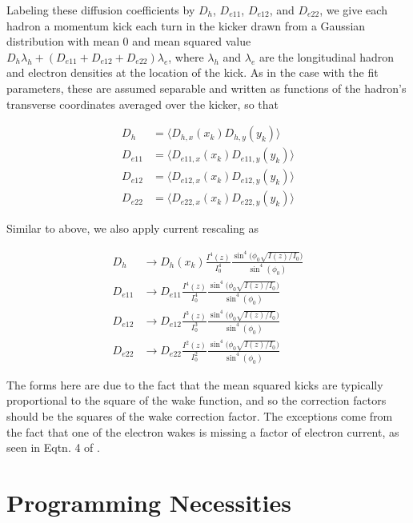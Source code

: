 \documentclass[letterpaper,11pt]{article}
\begin{document}
Labeling these diffusion coefficients by $D_h$, $D_{e11}$, $D_{e12}$, and $D_{e22}$, we give each hadron a momentum kick each turn in the kicker drawn from a Gaussian distribution with mean $0$ and mean squared value $D_h\lambda_h + (D_{e11} + D_{e12} + D_{e22})\lambda_e$, where $\lambda_h$ and $\lambda_e$ are the longitudinal hadron and electron densities at the location of the kick. As in the case with the fit parameters, these are assumed separable and written as functions of the hadron's transverse coordinates averaged over the kicker, so that 

\begin{align}\label{eqtn:cec_diff_avg}
	D_h &= \langle D_{h,x}(x_k) D_{h,y}(y_k)\rangle\\\nonumber
	D_{e11} &= \langle D_{e11,x}(x_k) D_{e11,y}(y_k)\rangle\\\nonumber
	D_{e12} &= \langle D_{e12,x}(x_k) D_{e12,y}(y_k)\rangle\\\nonumber
	D_{e22} &= \langle D_{e22,x}(x_k) D_{e22,y}(y_k)\rangle
\end{align}

Similar to above, we also apply current rescaling as 

\begin{align}
	D_h &\rightarrow D_h(x_k) \frac{I^4(z)}{I_0^4}\frac{\sin^4\big(\phi_0\sqrt{I(z)/I_0}\big)}{\sin^4(\phi_0)}\\\nonumber
	D_{e11} &\rightarrow D_{e11}\frac{I^4(z)}{I_0^4}\frac{\sin^4\big(\phi_0\sqrt{I(z)/I_0}\big)}{\sin^4(\phi_0)}\\\nonumber
	D_{e12} &\rightarrow D_{e12}\frac{I^3(z)}{I_0^3}\frac{\sin^4\big(\phi_0\sqrt{I(z)/I_0}\big)}{\sin^4(\phi_0)}\\\nonumber
	D_{e22} &\rightarrow D_{e22}\frac{I^2(z)}{I_0^2}\frac{\sin^4\big(\phi_0\sqrt{I(z)/I_0}\big)}{\sin^4(\phi_0)}
\end{align}

The forms here are due to the fact that the mean squared kicks are typically proportional to the square of the wake function, and so the correction factors should be the squares of the wake correction factor. The exceptions come from the fact that one of the electron wakes is missing a factor of electron current, as seen in Eqtn. 4 of \cite{cite:ipac2021}.


\section{Programming Necessities}
\end{document}
